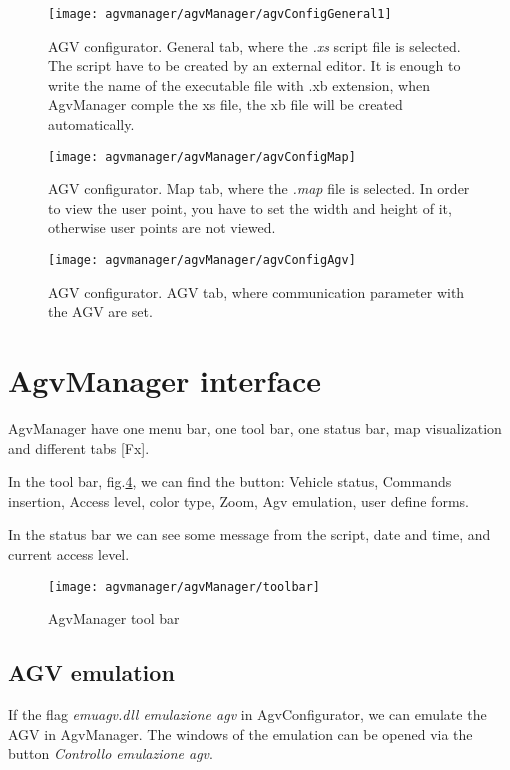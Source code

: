 \begin{figure}
	\centering\texttt{[image: agvmanager/agvManager/agvConfigGeneral1]}
	\caption{AGV configurator. General tab, where the \textit{.xs} script file is selected. The script have to be created by an external editor. It is enough to write the name of the executable file with .xb extension, when AgvManager comple the xs file, the xb file will be created automatically.}
	\label{fig:refConfigScript}
\end{figure}
\begin{figure}
	\centering\texttt{[image: agvmanager/agvManager/agvConfigMap]}
	\caption{AGV configurator. Map tab, where the \textit{.map} file is selected. In order to view the user point, you have to set the width and height of it, otherwise user points are not viewed.}
	\label{fig:refConfigMap}
\end{figure}
\begin{figure}
	\centering\texttt{[image: agvmanager/agvManager/agvConfigAgv]}
	\caption{AGV configurator. AGV tab, where communication parameter with the AGV are set.}
	\label{fig:refConfigAgv}
\end{figure}

\section{AgvManager interface}
AgvManager have one menu bar, one tool bar, one status bar, map visualization and different tabs [Fx].

In the tool bar, fig.\ref{fig:toolbar}, we can find the button: Vehicle status, Commands insertion, Access level, color type, Zoom, Agv emulation, user define forms.

In the status bar we can see some message from the script, date and time, and current access level.

\begin{figure}
	\centering\texttt{[image: agvmanager/agvManager/toolbar]}
	\caption{AgvManager tool bar }
	\label{fig:toolbar}
\end{figure}

\subsection{AGV emulation}
If the flag \textit{emuagv.dll emulazione agv} in AgvConfigurator, we can emulate the AGV in AgvManager. The windows of the emulation can be opened via the button \textit{Controllo emulazione agv}.\\

